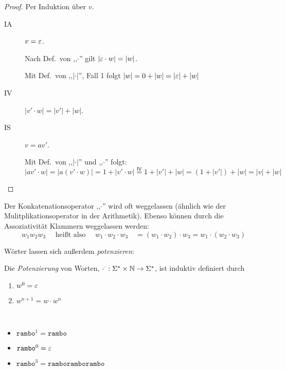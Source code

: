 \begin{proof}
  Per Induktion über $v$.
  \begin{description}
  \item[IA] $v = \varepsilon$.

    Nach Def.\ von ,,$\cdot$'' gilt $|\varepsilon \cdot w| = |w|$.

    Mit Def.\ von ,,$|\cdot|$'', Fall 1 folgt $|w| = 0 + |w| = |\varepsilon| + |w|$
 \item[IV] $|v' \cdot w| = |v'| + |w|$.
 \item[IS] $v = av'$.

   Mit Def.\ von ,,$|\cdot|$'' und ,,$\cdot$'' folgt:
   \begin{displaymath}
   |av'\cdot w| = |a(v'\cdot w)| = 1 + |v' \cdot w| \stackrel{\mathsf{IV}}{=} 1 + |v'| + |w| = (1 + |v'|) + |w| = |v| + |w|
   \end{displaymath}
  
  \end{description}
\end{proof}

Der Konkatenationsoperator ,,$\cdot$'' wird oft weggelassen (ähnlich wie der Mulitplikationsoperator in der Arithmetik).
Ebenso können durch die Assoziativität Klammern weggelassen werden:
\begin{displaymath}
  w_1w_2w_3 \quad \text{ heißt also } \quad w_1\cdot w_2\cdot w_3 \quad = (w_1 \cdot w_2) \cdot w_3 = w_1 \cdot (w_2 \cdot w_3)
\end{displaymath}

Wörter lassen sich außerdem \emph{potenzieren}:
\begin{Def}
  Die \emph{Potenzierung} von Worten, $\cdot ^ \cdot: \Sigma^*\times \mathbb{N} \to \Sigma^*$, ist induktiv definiert durch
  \begin{enumerate}
  \item $w^0 = \varepsilon$ 
  \item $w^{n+1} = w \cdot w^n$
  \end{enumerate}
\end{Def}
\begin{Bsp*} ~
  \begin{itemize}
  \item $\mathtt{rambo}^1 = \mathtt{rambo}$
  \item $\mathtt{rambo}^0 = \varepsilon$
  \item $\mathtt{rambo}^3 = \mathtt{ramboramborambo}$
  \end{itemize}
\end{Bsp*}

